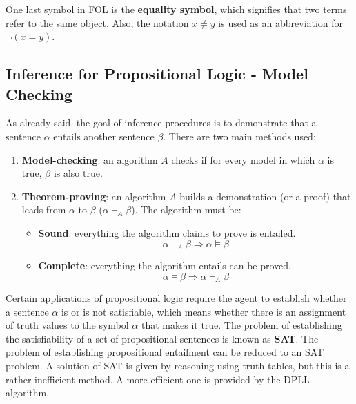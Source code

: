 \documentclass{article}
\begin{document}
One last symbol in FOL is the \textbf{equality symbol}, which signifies that two terms refer to the same object. Also, the notation $x\neq y$ is used as an abbreviation for $\neg(x=y)$.

\subsection{Inference for Propositional Logic - Model Checking}
As already said, the goal of inference procedures is to demonstrate that a sentence $\alpha$ entails another sentence $\beta$. There are two main methods used:
\begin{enumerate}
    \item \textbf{Model-checking}: an algorithm $A$ checks if for every model in which $\alpha$ is true, $\beta$ is also true.
    \item \textbf{Theorem-proving}: an algorithm $A$ builds a demonstration (or a proof) that leads from $\alpha$ to $\beta$ ($\alpha \vdash_A \beta$). The algorithm must be:
    \begin{itemize}
        \item \textbf{Sound}: everything the algorithm claims to prove is entailed.
            $$\alpha \vdash_A\beta\Rightarrow\alpha\models\beta$$
        \item \textbf{Complete}: everything the algorithm entails can be proved. 
            $$\alpha\models\beta\Rightarrow\alpha\vdash_A\beta$$
    \end{itemize}        
\end{enumerate}

Certain applications of propositional logic require the agent to establish whether a sentence $\alpha$ is or is not satisfiable, which means whether there is an assignment of truth values to the symbol $\alpha$ that makes it true. The problem of establishing the satisfiability of a set of propositional sentences is known as \textbf{SAT}. The problem of establishing propositional entailment can be reduced to an SAT problem. A solution of SAT is given by reasoning using truth tables, but this is a rather inefficient method. A more efficient one is provided by the DPLL algorithm.
\end{document}
